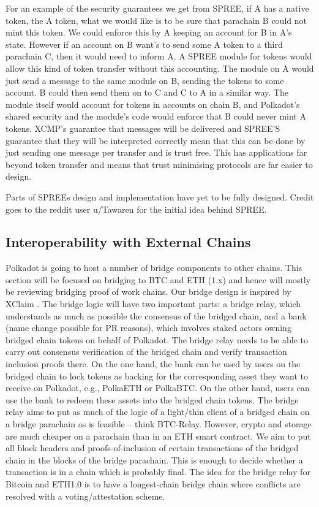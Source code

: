 For an example of the security guarantees we get from SPREE, if A has a native token, the A token, what we would like is to be sure that parachain B could not mint this token. We could enforce this by A keeping an account for B in A's state. However if an account on B want's to send some A token to a third parachain C, then it would need to inform A. A SPREE module for tokens would allow this kind of token transfer without this accounting. The module on A would just send a message to the same module on B, sending the tokens to some account. B could then send them on to C and C to A in a similar way. The module itself would account for tokens in accounts on chain B, and Polkadot's shared security and the module's code would enforce that B could never mint A tokens. XCMP's guarantee that messages will be delivered and SPREE'S guarantee that they will be interpreted correctly mean that this can be done by just sending one message per transfer and is trust free. This has applications far beyond token transfer and means that trust minimising protocols are far easier to design.

Parts of SPREEs design and implementation have yet to be fully designed. Credit goes to the reddit user u/Tawaren for the initial idea behind SPREE.

\subsection{Interoperability with External Chains}\label{sec:bridge}

Polkadot is going to host a number of bridge components to other chains. This section will be focused on bridging to BTC and ETH (1.x) and hence will mostly be reviewing bridging proof of work chains. Our bridge design is inspired by XClaim \cite{Zamyatin:2019:XClaim}.
The bridge logic will have two important parts: a bridge relay, which understands as much as possible the consensus of the bridged chain, and a bank (name change possible for PR reasons), which involves staked actors owning bridged chain tokens on behalf of Polkadot.
The bridge relay needs to be able to carry out consensus verification of the bridged chain and verify transaction inclusion proofs there. On the one hand, the bank can be used by users on the bridged chain to lock tokens as backing for the corresponding asset they want to receive on Polkadot, e.g., PolkaETH or PolkaBTC. On the other hand, users can use the bank to redeem these assets into the bridged chain tokens.
The bridge relay aims to put as much of the logic of a light/thin client of a bridged chain on a bridge parachain as is feasible – think BTC-Relay. However, crypto and storage are much cheaper on a parachain than in an ETH smart contract. We aim to put all block headers and proofs-of-inclusion of certain transactions of the bridged chain in the blocks of the bridge parachain. This is enough to decide whether a transaction is in a chain which is probably final. The idea for the bridge relay for Bitcoin and ETH1.0 is to have a longest-chain bridge chain where conflicts are resolved with a voting/attestation scheme.

